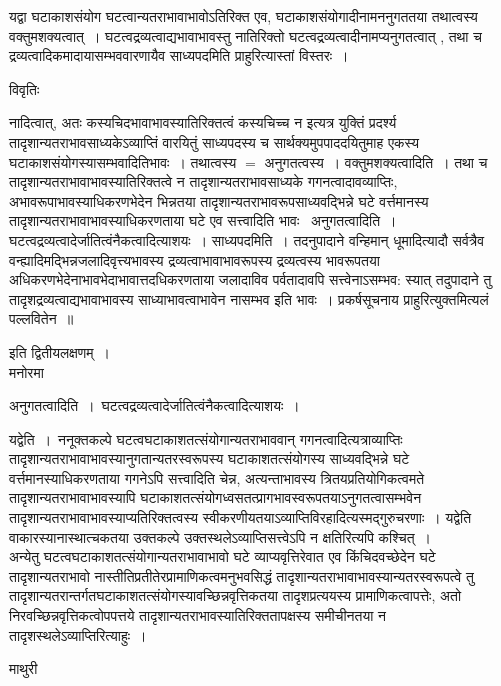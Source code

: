 \documentclass[10pt, openany]{book}
\begin{document}
{{\la यद्वा  घटाकाशसंयोग  घटत्वान्यतराभावाभावोऽतिरिक्त एव, घटाकाशसंयोगादीनामननुगततया तथात्वस्य वक्तुमशक्यत्वात्~। 
घटत्वद्रव्यत्वाद्यभावाभावस्तु नातिरिक्तो घटत्वद्रव्यत्वादीनामप्यनुगतत्वात् , तथा च द्रव्यत्वादिकमादायासम्भववारणायैव साध्यपदमिति प्राहुरित्यास्तां विस्तरः~।}
\begin{center}     विवृतिः \end{center}
नादित्वात्, अतः कस्यचिदभावाभावस्यातिरिक्तत्वं कस्यचिच्च न इत्यत्र युक्तिं प्रदर्श्य तादृशान्यतराभावसाध्यकेऽव्याप्तिं वारयितुं साध्यपदस्य च सार्थक्यमुपपाददयितुमाह  एकस्य घटाकाशसंयोगस्यासम्भवादितिभावः~। तथात्वस्य $=$ अनुगतत्वस्य~। {\qt वक्तुमशक्यत्वादिति}~। तथा च तादृशान्यतराभावाभावस्यातिरिक्तत्वे न तादृशान्यतराभावसाध्यके गगनत्वादावव्याप्तिः, अभावरूपाभावस्याधिकरणभेदेन भिन्नतया तादृशान्यतराभावरूपसाध्यवद्भिन्ने घटे वर्त्तमानस्य तादृशान्यतराभावाभावस्याधिकरणताया घटे एव सत्त्वादिति भावः~ अनुगतत्वादिति~। घटत्वद्रव्यत्वादेर्जातित्वंनैकत्वादित्याशयः~। {\la साध्यपदमिति~।} तदनुपादाने वन्हिमान् धूमादित्यादौ सर्वत्रैव
वन्ह्यादिमद्भिन्नजलादिवृत्त्यभावस्य द्रव्यत्वाभावाभावरूपस्य द्रव्यत्वस्य भावरूपतया अधिकरणभेदेनाभावभेदाभावात्तदधिकरणताया जलादाविव पर्वतादावपि
सत्त्वेनाऽसम्भव: स्यात् तदुपादाने तु तादृशद्रव्यत्वाद्यभावाभावस्य साध्याभावत्वाभावेन नासम्भव इति भावः~। प्रकर्षसूचनाय प्राहुरित्युक्तमित्यलं
पल्लवितेन~॥
\begin{center} इति द्वितीयलक्षणम्~।\\  मनोरमा  \end{center}अनुगतत्वादिति~।~घटत्वद्रव्यत्वादेर्जातित्वंनैकत्वादित्याशयः~।

{\la यद्वेति~।}~ननूक्तकल्पे घटत्वघटाकाशतत्संयोगान्यतराभाववान् गगनत्वादित्यत्राव्याप्तिः तादृशान्यतराभावाभावस्यानुगतान्यतरस्वरूपस्य घटाकाशतत्संयोगस्य
साध्यवद्भिन्ने घटे वर्त्तमानस्याधिकरणताया गगनेऽपि सत्त्वादिति चेन्न, अत्यन्ताभावस्य त्रितयप्रतियोगिकत्वमते तादृशान्यतराभावाभावस्यापि घटाकाशतत्संयोगध्वसतत्प्रागभावस्वरूपतयाऽनुगतत्वासम्भवेन तादृशान्यतराभावाभावस्याप्यतिरिक्तत्वस्य स्वीकरणीयतयाऽव्याप्तिविरहादित्यस्मद्गुरुचरणाः~। यद्वेति वाकारस्यानास्थात्चकतया उक्तकल्पे उक्तस्थलेऽव्याप्तिसत्त्वेऽपि न क्षतिरित्यपि कश्चित्~।\\

अन्येतु घटत्वघटाकाशतत्संयोगान्यतराभावाभावो घटे व्याप्यवृत्तिरेवात एव किंचिदवच्छेदेन घटे तादृशान्यतराभावो नास्तीतिप्रतीतेरप्रामाणिकत्वमनुभवसिद्धं
तादृशान्यतराभावाभावस्यान्यतरस्वरूपत्वे तु तादृशान्यतरान्तर्गतघटाकाशतत्संयोगस्यावच्छिन्नवृत्तिकतया तादृशप्रत्ययस्य प्रामाणिकत्वापत्तेः, अतो निरवच्छिन्नवृत्तिकत्वोपपत्तये
तादृशान्यतराभावस्यातिरिक्ततापक्षस्य समीचीनतया न तादृशस्थलेऽव्याप्तिरित्याहुः~।
\newpage
 \begin{center}  माथुरी  \end{center} 

}
\end{document}

